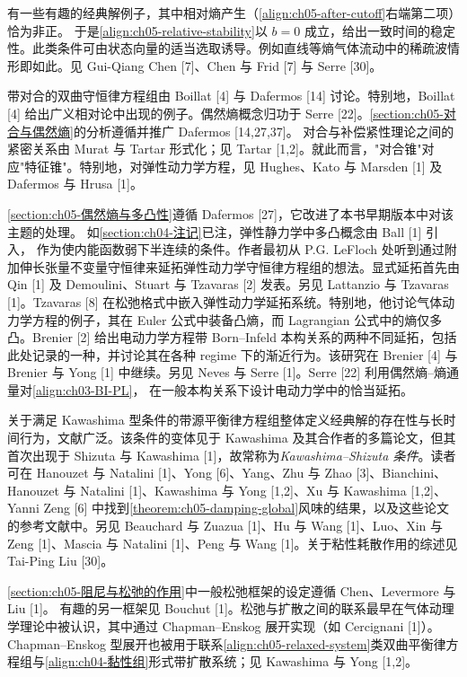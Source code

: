 \documentclass[../../main.tex]{subfiles}
\begin{document}
有一些有趣的经典解例子，其中相对熵产生（\eqref{align:ch05-after-cutoff}右端第二项）恰为非正。
于是\eqref{align:ch05-relative-stability}以 $b=0$ 成立，给出一致时间的稳定性。此类条件可由状态向量的适当选取诱导。例如直线等熵气体流动中的稀疏波情形即如此。见 Gui-Qiang Chen [7]、Chen 与 Frid [7] 与 Serre [30]。

带对合的双曲守恒律方程组由 Boillat [4] 与 Dafermos [14] 讨论。特别地，Boillat [4] 给出广义相对论中出现的例子。偶然熵概念归功于 Serre [22]。\cref{section:ch05-对合与偶然熵}的分析遵循并推广 Dafermos [14,27,37]。
对合与补偿紧性理论之间的紧密关系由 Murat 与 Tartar 形式化；见 Tartar [1,2]。就此而言，"对合锥"对应"特征锥"。特别地，对弹性动力学方程，见 Hughes、Kato 与 Marsden [1] 及 Dafermos 与 Hrusa [1]。

\cref{section:ch05-偶然熵与多凸性}遵循 Dafermos [27]，它改进了本书早期版本中对该主题的处理。
如\cref{section:ch04-注记}已注，弹性静力学中多凸概念由 Ball [1] 引入，
作为使内能函数弱下半连续的条件。作者最初从 P.G. LeFloch 处听到通过附加伸长张量不变量守恒律来延拓弹性动力学守恒律方程组的想法。显式延拓首先由 Qin [1] 及 Demoulini、Stuart 与 Tzavaras [2] 发表。另见 Lattanzio 与 Tzavaras [1]。Tzavaras [8] 在松弛格式中嵌入弹性动力学延拓系统。特别地，他讨论气体动力学方程的例子，其在 Euler 公式中装备凸熵，而 Lagrangian 公式中的熵仅多凸。Brenier [2] 给出电动力学方程带 Born--Infeld 本构关系的两种不同延拓，包括此处记录的一种，并讨论其在各种 regime 下的渐近行为。该研究在 Brenier [4] 与 Brenier 与 Yong [1] 中继续。另见 Neves 与 Serre [1]。Serre [22] 利用偶然熵--熵通量对\eqref{align:ch03-BI-PL}，
在一般本构关系下设计电动力学中的恰当延拓。

关于满足 Kawashima 型条件的带源平衡律方程组整体定义经典解的存在性与长时间行为，文献广泛。该条件的变体见于 Kawashima 及其合作者的多篇论文，但其首次出现于 Shizuta 与 Kawashima [1]，故常称为\emph{Kawashima--Shizuta 条件}。读者可在 Hanouzet 与 Natalini [1]、Yong [6]、Yang、Zhu 与 Zhao [3]、Bianchini、Hanouzet 与 Natalini [1]、Kawashima 与 Yong [1,2]、Xu 与 Kawashima [1,2]、Yanni Zeng [6] 中找到\cref{theorem:ch05-damping-global}风味的结果，以及这些论文的参考文献中。另见 Beauchard 与 Zuazua [1]、Hu 与 Wang [1]、Luo、Xin 与 Zeng [1]、Mascia 与 Natalini [1]、Peng 与 Wang [1]。关于粘性耗散作用的综述见 Tai-Ping Liu [30]。

\cref{section:ch05-阻尼与松弛的作用}中一般松弛框架的设定遵循 Chen、Levermore 与 Liu [1]。
有趣的另一框架见 Bouchut [1]。松弛与扩散之间的联系最早在气体动理学理论中被认识，其中通过 Chapman--Enskog 展开实现（如 Cercignani [1]）。Chapman--Enskog 型展开也被用于联系\eqref{align:ch05-relaxed-system}类双曲平衡律方程组与\eqref{align:ch04-黏性组}形式带扩散系统；见 Kawashima 与 Yong [1,2]。
\end{document}

